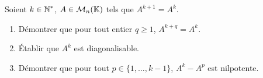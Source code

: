 \documentclass[10pt]{scrartcl}
\begin{document}
    \begin{exo}
        Soient $k\in\operatorname{\mathbb N}^*$, $A\in\mathcal M_n(\operatorname{\mathbb K})$ tels que $A^{k+1}=A^k$.
        \begin{enumerate}
            \item Démontrer que pour tout entier $q\geq 1$, $A^{k+q}=A^k$.
            \item Établir que $A^k$ est diagonalisable.
            \item Démontrer que pour tout $p\in\lbrace 1,\dots,k-1\rbrace$,  $A^k-A^p$ est nilpotente.
        \end{enumerate}
    \end{exo}
\end{document}
